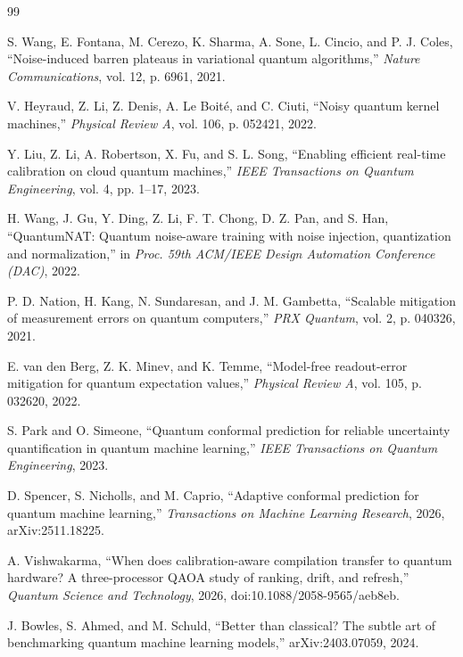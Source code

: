 \documentclass[10pt,conference]{IEEEtran}
\begin{document}
\begin{thebibliography}{99}

S. Wang, E. Fontana, M. Cerezo, K. Sharma, A. Sone, L. Cincio, and P. J. Coles, ``Noise-induced
barren plateaus in variational quantum algorithms,'' \emph{Nature Communications}, vol. 12,
p. 6961, 2021.

V. Heyraud, Z. Li, Z. Denis, A. Le Boit\'e, and C. Ciuti, ``Noisy quantum kernel machines,''
\emph{Physical Review A}, vol. 106, p. 052421, 2022.

Y. Liu, Z. Li, A. Robertson, X. Fu, and S. L. Song, ``Enabling efficient real-time calibration on
cloud quantum machines,'' \emph{IEEE Transactions on Quantum Engineering}, vol. 4, pp. 1--17,
2023.

H. Wang, J. Gu, Y. Ding, Z. Li, F. T. Chong, D. Z. Pan, and S. Han, ``QuantumNAT: Quantum
noise-aware training with noise injection, quantization and normalization,'' in \emph{Proc. 59th
ACM/IEEE Design Automation Conference (DAC)}, 2022.

P. D. Nation, H. Kang, N. Sundaresan, and J. M. Gambetta, ``Scalable mitigation of measurement
errors on quantum computers,'' \emph{PRX Quantum}, vol. 2, p. 040326, 2021.

E. van den Berg, Z. K. Minev, and K. Temme, ``Model-free readout-error mitigation for quantum
expectation values,'' \emph{Physical Review A}, vol. 105, p. 032620, 2022.

S. Park and O. Simeone, ``Quantum conformal prediction for reliable uncertainty quantification in
quantum machine learning,'' \emph{IEEE Transactions on Quantum Engineering}, 2023.

D. Spencer, S. Nicholls, and M. Caprio, ``Adaptive conformal prediction for quantum machine
learning,'' \emph{Transactions on Machine Learning Research}, 2026, arXiv:2511.18225.

A. Vishwakarma, ``When does calibration-aware compilation transfer to quantum hardware? A
three-processor QAOA study of ranking, drift, and refresh,'' \emph{Quantum Science and
Technology}, 2026, doi:10.1088/2058-9565/aeb8eb.

J. Bowles, S. Ahmed, and M. Schuld, ``Better than classical? The subtle art of benchmarking
quantum machine learning models,'' arXiv:2403.07059, 2024.


\end{thebibliography}
\end{document}
